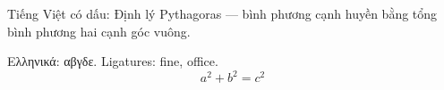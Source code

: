 \documentclass{article}
\begin{document}
Tiếng Việt có dấu: Định lý Pythagoras — bình phương cạnh huyền bằng tổng bình phương hai cạnh góc vuông.

Ελληνικά: αβγδε. Ligatures: ﬁne, office.
\[ a^2 + b^2 = c^2 \]
\end{document}
